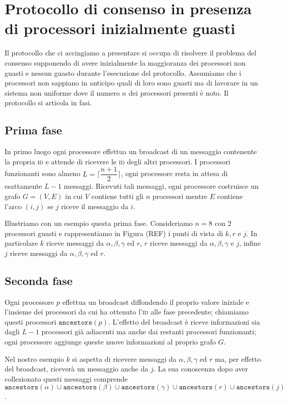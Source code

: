 \documentclass{article}
\begin{document}
\section{Protocollo di consenso in presenza di processori inizialmente guasti}

Il protocollo che ci accingiamo a presentare si occupa di risolvere il problema del consenso supponendo di avere inizialmente la maggioranza dei processori non guasti e nessun guasto durante l'esecuzione del protocollo. Assumiamo che i processori non sappiano in anticipo quali di loro sono guasti ma di lavorare in un sistema non uniforme dove il numero $n$ dei processori presenti è noto. Il protocollo si articola in fasi.
\subsection{Prima fase}
In primo luogo ogni processore effettua un broadcast di un messaggio contenente la propria \textsc{id} e attende di ricevere le \textsc{id} degli altri processori. I processori funzionanti sono almeno $L=\lceil\dfrac{n+1}{2}\rceil$, ogni processore resta in attesa di esattamente $L-1$ messaggi. 
Ricevuti tali messaggi, ogni processore costruisce un grafo $G=(V,E)$ in cui $V$ contiene tutti gli $n$ processori mentre $E$ contiene l'arco $(i,j)$ se $j$ riceve il messaggio da $i$.  

Illustriamo con un esempio questa prima fase. Consideriamo $n=8$ con $2$ processori guasti e rappresentiamo in Figura (REF) i punti di vista di $k,r$ e $j$. In particolare $k$ riceve messaggi da $\alpha, \beta, \gamma$ ed $r$, $r$ riceve messaggi da $\alpha, \beta, \gamma$ e $j$, infine $j$ riceve messaggi da $\alpha, \beta, \gamma$ ed $r$.

\subsection{Seconda fase}
Ogni processore $p$ effettua un broadcast diffondendo il proprio valore iniziale e l'insieme dei processori da cui ha ottenuto l'\textsc{id} alle fase precedente; chiamiamo questi processori $\texttt{ancestors}(p)$. L'effetto del broadcast è riceve informazioni sia dagli $L-1$ processori già adiacenti ma anche dai restanti processori funzionanti; ogni processore aggiunge queste nuove informazioni al proprio grafo $G$.

Nel nostro esempio $k$ si aspetta di ricevere messaggi da $\alpha, \beta, \gamma$ ed $r$ ma, per effetto del broadcast, riceverà un messaggio anche da $j$. La sua conoscenza dopo aver collezionato questi messaggi comprende $\texttt{ancestors}(\alpha)\cup\texttt{ancestors}(\beta)\cup\texttt{ancestors}(\gamma)\cup\texttt{ancestors}(r)\cup\texttt{ancestors}(j)$.
\end{document}
